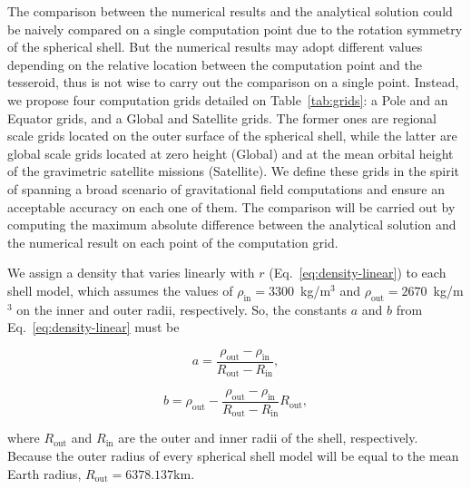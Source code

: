 \documentclass[extra, referee]{gji}
\begin{document}
The comparison between the numerical results and the analytical solution could be
naively compared on a single computation point due to the rotation symmetry of the
spherical shell.
But the numerical results may adopt different values depending on the relative location
between the computation point and the tesseroid, thus is not wise to carry out the
comparison on a single point.
Instead, we propose four computation grids detailed on Table~\ref{tab:grids}: a Pole and
an Equator grids, and a Global and Satellite grids.
The former ones are regional scale grids located on the outer surface of the spherical
shell, while the latter are global scale grids located at zero height (Global) and at
the mean orbital height of the gravimetric satellite missions (Satellite).
We define these grids in the spirit of spanning a broad scenario of gravitational field
computations and ensure an acceptable accuracy on each one of them.
The comparison will be carried out by computing the maximum absolute difference between
the analytical solution and the numerical result on each point of the computation grid.

We assign a density that varies linearly with $r$ (Eq.~\ref{eq:density-linear}) to each
shell model, which assumes the values of $\rho_\text{in} = 3300$~kg/m$^3$ and
$\rho_\text{out} = 2670$~kg/m$^3$ on the inner and outer radii, respectively.
So, the constants $a$ and $b$ from Eq.~\ref{eq:density-linear} must be

\begin{equation}
    a = \frac{\rho_\text{out} - \rho_\text{in}}{R_\text{out} - R_\text{in}},
\end{equation}

\begin{equation}
    b = \rho_\text{out} -
    \frac{\rho_\text{out} - \rho_\text{in}}{R_\text{out} - R_\text{in}} R_\text{out},
\end{equation}

\noindent
where $R_\text{out}$ and $R_\text{in}$ are the outer and inner radii of the shell,
respectively.
Because the outer radius of every spherical shell model will be equal to the mean Earth
radius, $R_\text{out} = 6378.137 \text{km}$.
\end{document}
